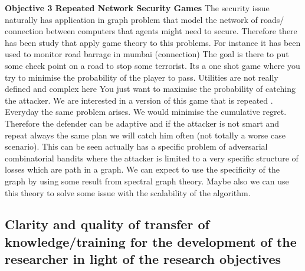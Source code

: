 \documentclass[a4paper,11pt]{article}
\renewcommand{\cite}{\autocite} %
\begin{document}
\textbf{Objective 3 Repeated Network Security Games}
The security issue naturally has application in graph problem that model the network of roads/ connection between computers that agents might need to secure. Therefore there has been study that apply game theory to this problems. For instance it has been used to monitor road barrage in mumbai (connection) The goal is there to put some check point on a road to stop some terrorist. Its a one shot game where you try to minimise the probability of the player to pass.  Utilities are not really defined and complex here You just want to maximise the probability of catching the attacker. We are interested in a version of this game that is repeated . Everyday the same problem arises. We would minimise the cumulative regret. Therefore the defender can be adaptive and if the attacker is not smart and repeat always the same plan we will catch him often (not totally a worse case scenario). This can be seen actually has a specific problem of adversarial combinatorial bandits where the  attacker is limited to a very specific structure of losses which are path in a graph. We can expect to use the specificity of the graph by using some result from spectral graph theory. Maybe also we can use this theory to solve some issue with the scalability of the algorithm.












\subsection{Clarity and quality of transfer of knowledge/training for the development of the researcher in light of the research objectives}
\label{sec:transfer}
\end{document}
